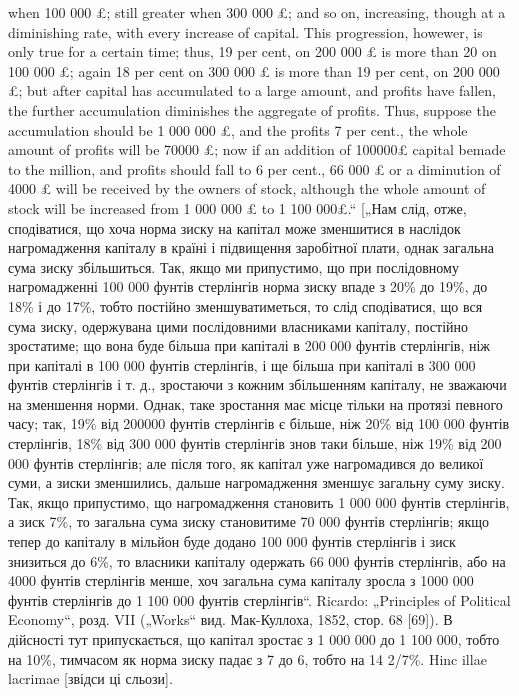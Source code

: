 when 100 000 £; still greater when 300 000  £; and so on, increasing, though at a
diminishing rate, with every increase of capital. This progression, howewer, is only
true for a certain time; thus, 19 per cent, on 200 000 £ is more than 20 on 100 000 £;
again 18 per cent on 300 000 £ is more than 19 per cent, on 200 000 £; but after
capital has accumulated to a large amount, and profits have fallen, the further
accumulation diminishes the aggregate of profits. Thus, suppose the accumulation
should be 1 000 000 £, and the profits 7 per cent., the whole amount of profits will be
70000 £; now if an addition of 100000£ capital bemade to the million, and profits should
fall to 6 per cent., 66 000 £ or a diminution of 4000 £ will be received by the owners
of stock, although the whole amount of stock will be increased from 1 000 000 £ to
1 100 000£.“ [„Нам слід, отже, сподіватися, що хоча норма зиску на капітал може
зменшитися в наслідок нагромадження капіталу в країні і підвищення заробітної
плати, однак загальна сума зиску збільшиться. Так, якщо ми припустимо, що при
послідовному нагромадженні 100 000 фунтів стерлінгів норма зиску впаде з 20\% до
19\%, до 18\% і до 17\%, тобто постійно зменшуватиметься, то слід сподіватися,
що вся сума зиску, одержувана цими послідовними власниками капіталу, постійно
зростатиме; що вона буде більша при капіталі в 200 000 фунтів стерлінгів,
ніж при капіталі в 100 000 фунтів стерлінгів, і ще більша при капіталі
в 300 000 фунтів стерлінгів і т. д., зростаючи з кожним збільшенням капіталу,
не зважаючи на зменшення норми. Однак, таке зростання має місце тільки на
протязі певного часу; так, 19\% від 200000 фунтів стерлінгів є більше, ніж 20\%
від 100 000 фунтів стерлінгів, 18\% від 300 000 фунтів стерлінгів знов таки
більше, ніж 19\% від 200 000 фунтів стерлінгів; але після того, як капітал уже
нагромадився до великої суми, а зиски зменшились, дальше нагромадження
зменшує загальну суму зиску. Так, якщо припустимо, що нагромадження
становить 1 000 000 фунтів стерлінгів, а зиск 7\%, то загальна сума зиску становитиме
70 000 фунтів стерлінгів; якщо тепер до капіталу в мільйон буде
додано 100 000 фунтів стерлінгів і зиск знизиться до 6\%, то власники капіталу
одержать 66 000 фунтів стерлінгів, або на 4000 фунтів стерлінгів менше, хоч
загальна сума капіталу зросла з 1000 000 фунтів стерлінгів до 1 100 000 фунтів
стерлінгів“. Ricardo: „Principles of Political Economy“, розд. VII („Works“
вид. Мак-Куллоха, 1852, стор. 68 [69]). В дійсності тут припускається, що капітал
зростає з 1 000 000 до 1 100 000, тобто на 10\%, тимчасом як норма зиску
падає з 7 до 6, тобто на 14 2/7\%. Hinc illae lacrimae [звідси ці сльози].
